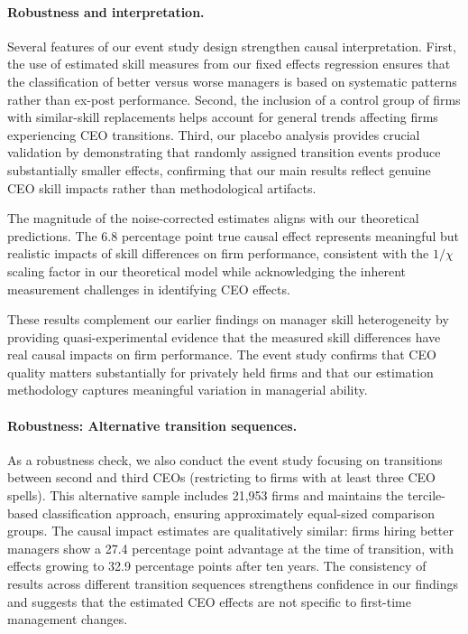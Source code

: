 \documentclass[11pt,a4paper]{article}
\begin{document}
\paragraph{Robustness and interpretation.} Several features of our event study design strengthen causal interpretation. First, the use of estimated skill measures from our fixed effects regression ensures that the classification of better versus worse managers is based on systematic patterns rather than ex-post performance. Second, the inclusion of a control group of firms with similar-skill replacements helps account for general trends affecting firms experiencing CEO transitions. Third, our placebo analysis provides crucial validation by demonstrating that randomly assigned transition events produce substantially smaller effects, confirming that our main results reflect genuine CEO skill impacts rather than methodological artifacts.

The magnitude of the noise-corrected estimates aligns with our theoretical predictions. The 6.8 percentage point true causal effect represents meaningful but realistic impacts of skill differences on firm performance, consistent with the $1/\chi$ scaling factor in our theoretical model while acknowledging the inherent measurement challenges in identifying CEO effects.

These results complement our earlier findings on manager skill heterogeneity by providing quasi-experimental evidence that the measured skill differences have real causal impacts on firm performance. The event study confirms that CEO quality matters substantially for privately held firms and that our estimation methodology captures meaningful variation in managerial ability.

\paragraph{Robustness: Alternative transition sequences.} As a robustness check, we also conduct the event study focusing on transitions between second and third CEOs (restricting to firms with at least three CEO spells). This alternative sample includes 21,953 firms and maintains the tercile-based classification approach, ensuring approximately equal-sized comparison groups. The causal impact estimates are qualitatively similar: firms hiring better managers show a 27.4 percentage point advantage at the time of transition, with effects growing to 32.9 percentage points after ten years. The consistency of results across different transition sequences strengthens confidence in our findings and suggests that the estimated CEO effects are not specific to first-time management changes.
\end{document}
